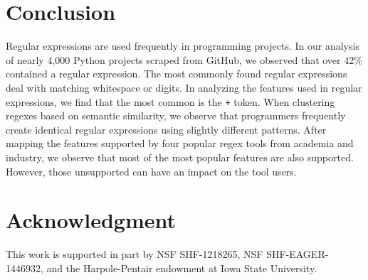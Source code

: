 \documentclass{sig-alternate}
\newcommand{\todoMid}[1]{}%
\begin{document}
\section{Conclusion}
\label{sec:conclusion}
Regular expressions are used frequently in programming projects. In our analysis of nearly 4,000 Python projects scraped from GitHub, we observed that over 42\% contained a regular expression. The most commonly found regular expressions deal with matching whitespace or digits.
In analyzing the features used in regular expressions, we find that the most common is the {\tt +} token.
When clustering regexes based on semantic similarity, we observe that programmers frequently create identical regular expressions using slightly different patterns. After mapping the features supported by four popular regex tools from academia and industry, we observe that most of the most popular features are also supported. However, those  unsupported can have an impact on the tool users.

\todoMid{add: mining regexes from repos represents just a fraction of all regexes composed by developers. A deeper study into programmer behavior regarding regex usage in all tools, not just those that appear in repos, is needed, and left for future work}

\section*{Acknowledgment}
This work is supported in part by NSF SHF-1218265, NSF SHF-EAGER-1446932, and the Harpole-Pentair endowment at Iowa State University.




\balance




\end{document}
